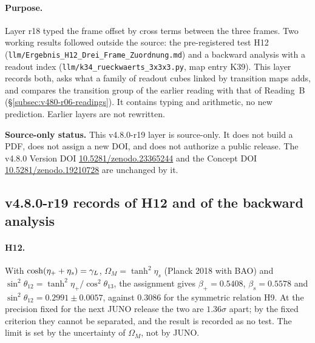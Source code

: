 \paragraph{Purpose.}
Layer r18 typed the frame offset by cross terms between the three frames.  Two working results followed outside the
source: the pre-registered test H12 (\texttt{llm/Ergebnis\_H12\_Drei\_Frame\_Zuordnung.md}) and a backward analysis
with a readout index (\texttt{llm/k34\_rueckwaerts\_3x3x3.py}, map entry K39).  This layer records both, asks what a
family of readout cubes linked by transition maps adds, and compares the transition group of the earlier reading with
that of Reading~B (\S\ref{subsec:v480-r06-readings}).  It contains typing and arithmetic, no new prediction.  Earlier
layers are not rewritten.

\noindent\textbf{Source-only status.}
This v4.8.0-r19 layer is source-only.  It does not build a PDF, does not assign a new DOI,
and does not authorize a public release.  The v4.8.0 Version DOI
\href{https://doi.org/10.5281/zenodo.23365244}{10.5281/zenodo.23365244} and the Concept DOI
\href{https://doi.org/10.5281/zenodo.19210728}{10.5281/zenodo.19210728} are unchanged by it.

\subsection*{v4.8.0-r19 records of H12 and of the backward analysis}
\label{subsec:v480-r19-records}

\paragraph{H12.}
With \(\cosh(\eta_++\eta_s)=\gamma_L\), \(\Omega_M=\tanh^2\eta_s\) (Planck 2018 with BAO) and
\(\sin^2\theta_{12}=\tanh^2\eta_+/\cos^2\theta_{13}\), the assignment gives \(\beta_+=0.5408\), \(\beta_s=0.5578\) and
\(\sin^2\theta_{12}=0.2991\pm0.0057\), against \(0.3086\) for the symmetric relation H9.  At the precision fixed for
the next JUNO release the two are \(1.36\sigma\) apart; by the fixed criterion they cannot be separated, and the
result is recorded as no test.  The limit is set by the uncertainty of \(\Omega_M\), not by JUNO.

